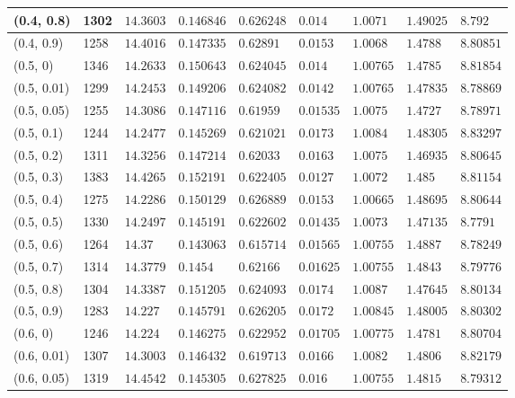 \begin{center}
{\begin{longtable}{| l | p{} |  p{} | p{} | p{} | p{} | p{} | p{} | p{} |}
 (0.4, 0.8) & 1302  & $14.3603$ & $0.146846$ & $0.626248$ & $0.014$ & $1.0071$ & $1.49025$ & $8.792$ \\ \hline
 (0.4, 0.9) & 1258  & $14.4016$ & $0.147335$ & $0.62891$ & $0.0153$ & $1.0068$ & $1.4788$ & $8.80851$ \\ \hline
 (0.5, 0) & 1346  & $14.2633$ & $0.150643$ & $0.624045$ & $0.014$ & $1.00765$ & $1.4785$ & $8.81854$ \\ \hline
 (0.5, 0.01) & 1299  & $14.2453$ & $0.149206$ & $0.624082$ & $0.0142$ & $1.00765$ & $1.47835$ & $8.78869$ \\ \hline
 (0.5, 0.05) & 1255  & $14.3086$ & $0.147116$ & $0.61959$ & $0.01535$ & $1.0075$ & $1.4727$ & $8.78971$ \\ \hline
 (0.5, 0.1) & 1244  & $14.2477$ & $0.145269$ & $0.621021$ & $0.0173$ & $1.0084$ & $1.48305$ & $8.83297$ \\ \hline
 (0.5, 0.2) & 1311  & $14.3256$ & $0.147214$ & $0.62033$ & $0.0163$ & $1.0075$ & $1.46935$ & $8.80645$ \\ \hline
 (0.5, 0.3) & 1383  & $14.4265$ & $0.152191$ & $0.622405$ & $0.0127$ & $1.0072$ & $1.485$ & $8.81154$ \\ \hline
 (0.5, 0.4) & 1275  & $14.2286$ & $0.150129$ & $0.626889$ & $0.0153$ & $1.00665$ & $1.48695$ & $8.80644$ \\ \hline
 (0.5, 0.5) & 1330  & $14.2497$ & $0.145191$ & $0.622602$ & $0.01435$ & $1.0073$ & $1.47135$ & $8.7791$ \\ \hline
 (0.5, 0.6) & 1264  & $14.37$ & $0.143063$ & $0.615714$ & $0.01565$ & $1.00755$ & $1.4887$ & $8.78249$ \\ \hline
 (0.5, 0.7) & 1314  & $14.3779$ & $0.1454$ & $0.62166$ & $0.01625$ & $1.00755$ & $1.4843$ & $8.79776$ \\ \hline
 (0.5, 0.8) & 1304  & $14.3387$ & $0.151205$ & $0.624093$ & $0.0174$ & $1.0087$ & $1.47645$ & $8.80134$ \\ \hline
 (0.5, 0.9) & 1283  & $14.227$ & $0.145791$ & $0.626205$ & $0.0172$ & $1.00845$ & $1.48005$ & $8.80302$ \\ \hline
 (0.6, 0) & 1246  & $14.224$ & $0.146275$ & $0.622952$ & $0.01705$ & $1.00775$ & $1.4781$ & $8.80704$ \\ \hline
 (0.6, 0.01) & 1307  & $14.3003$ & $0.146432$ & $0.619713$ & $0.0166$ & $1.0082$ & $1.4806$ & $8.82179$ \\ \hline
 (0.6, 0.05) & 1319  & $14.4542$ & $0.145305$ & $0.627825$ & $0.016$ & $1.00755$ & $1.4815$ & $8.79312$ \\ \hline

\end{longtable}}
\end{center}
